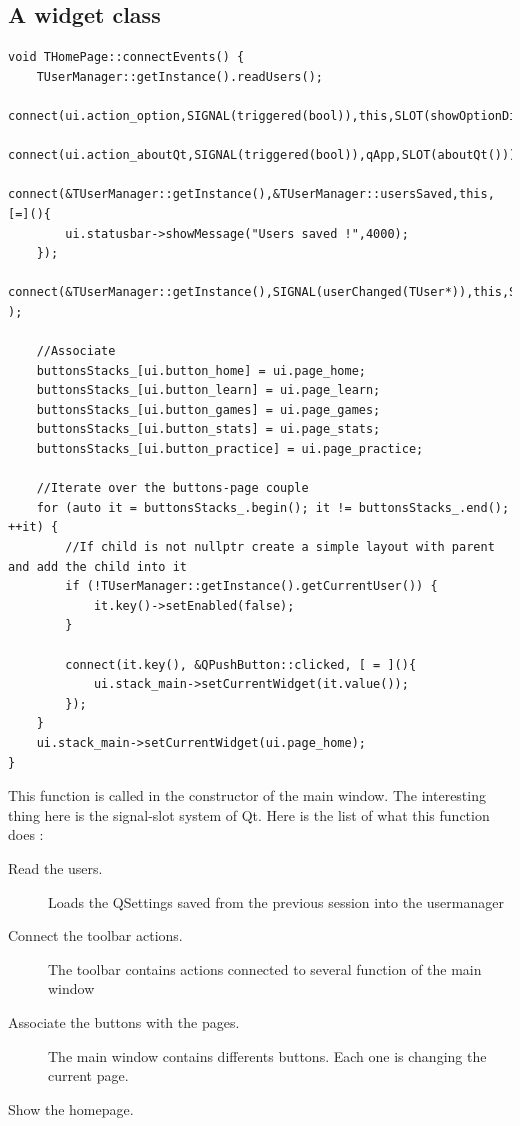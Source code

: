 \subsection{A widget class}
\begin{lstlisting}
void THomePage::connectEvents() {
    TUserManager::getInstance().readUsers();
    connect(ui.action_option,SIGNAL(triggered(bool)),this,SLOT(showOptionDialog()));
    connect(ui.action_aboutQt,SIGNAL(triggered(bool)),qApp,SLOT(aboutQt()));
    connect(&TUserManager::getInstance(),&TUserManager::usersSaved,this,[=](){
        ui.statusbar->showMessage("Users saved !",4000);
    });
    connect(&TUserManager::getInstance(),SIGNAL(userChanged(TUser*)),this,SLOT(updateUI(TUser*)) );

	//Associate 
    buttonsStacks_[ui.button_home] = ui.page_home;
    buttonsStacks_[ui.button_learn] = ui.page_learn;
    buttonsStacks_[ui.button_games] = ui.page_games;
    buttonsStacks_[ui.button_stats] = ui.page_stats;
    buttonsStacks_[ui.button_practice] = ui.page_practice;

    //Iterate over the buttons-page couple
    for (auto it = buttonsStacks_.begin(); it != buttonsStacks_.end(); ++it) {
        //If child is not nullptr create a simple layout with parent and add the child into it
        if (!TUserManager::getInstance().getCurrentUser()) {
            it.key()->setEnabled(false);
        }

        connect(it.key(), &QPushButton::clicked, [ = ](){
            ui.stack_main->setCurrentWidget(it.value());
        });
    }
    ui.stack_main->setCurrentWidget(ui.page_home);
}
\end{lstlisting}
This function is called in the constructor of the main window. The interesting thing here is the signal-slot system of Qt.
Here is the list of what this function does :
\begin{description}
	\item[Read the users.] Loads the QSettings saved from the previous session into the usermanager
	\item[Connect the toolbar actions.] The toolbar contains actions connected to several function of the main window
	\item[Associate the buttons with the pages.] The main window contains differents buttons. Each one is changing the current page.
	\item[Show the homepage.]
\end{description}

